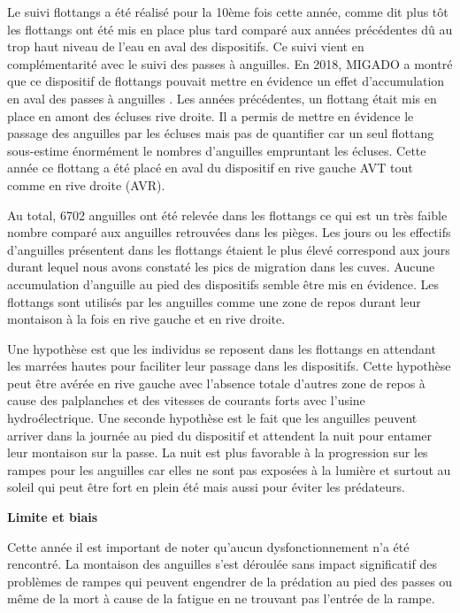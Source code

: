 \documentclass[11pt,titlepage,twoside]{article}\usepackage[]{graphicx}\usepackage[table]{xcolor}
\begin{document}
\vspace{0.5cm}
Le suivi flottangs a été réalisé pour la 10ème fois cette année, comme dit plus tôt les flottangs ont été mis en place plus tard comparé aux années précédentes dû au trop haut niveau de l’eau en aval des dispositifs. Ce suivi vient en complémentarité avec le suivi des passes à anguilles. En 2018, MIGADO a montré que ce dispositif de flottangs pouvait mettre en évidence un effet d’accumulation en aval des passes à anguilles \citep{lauronce_actions_2018}. Les années précédentes, un flottang était mis en place en amont des écluses rive droite. Il a permis de mettre en évidence le passage des anguilles par les écluses mais pas de quantifier car un seul flottang sous-estime énormément le nombres d’anguilles empruntant les écluses. Cette année ce flottang a été placé en aval du dispositif en rive gauche AVT tout comme en rive droite (AVR). 

\vspace{0.5cm}
Au total, 6702 anguilles ont été relevée dans les flottangs ce qui est un très faible nombre comparé aux anguilles retrouvées dans les pièges. Les jours ou les effectifs d’anguilles présentent dans les flottangs étaient le plus élevé correspond aux jours durant lequel nous avons constaté les pics de migration dans les cuves. Aucune accumulation d’anguille au pied des dispositifs semble être mis en évidence. Les flottangs sont utilisés par les anguilles comme une zone de repos durant leur montaison à la fois en rive gauche et en rive droite. 

\vspace{0.5cm}
Une hypothèse est que les individus se reposent dans les flottangs en attendant les marrées hautes pour faciliter leur passage dans les dispositifs. Cette hypothèse peut être avérée en rive gauche avec l’absence totale d’autres zone de repos à cause des palplanches et des vitesses de courants forts avec l’usine hydroélectrique. Une seconde hypothèse est le fait que les anguilles peuvent arriver dans la journée au pied du dispositif et attendent la nuit pour entamer leur montaison sur la passe. La nuit est plus favorable à la progression sur les rampes pour les anguilles car elles ne sont pas exposées à la lumière et surtout au soleil qui peut être fort en plein été mais aussi pour éviter les prédateurs. 

\vspace{0.5cm}
\textbf{Limite et biais}
 

Cette année il est important de noter qu’aucun dysfonctionnement n’a été rencontré. La montaison des anguilles s’est déroulée sans impact significatif des problèmes de rampes qui peuvent engendrer de la prédation au pied des passes ou même de la mort à cause de la fatigue en ne trouvant pas l’entrée de la rampe.
\end{document}
